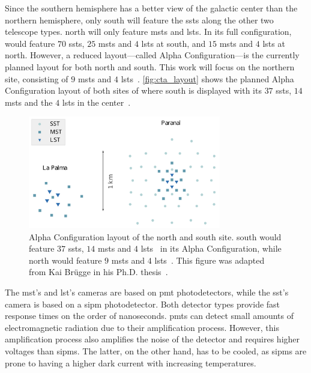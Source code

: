 Since the southern hemisphere has a better view of the galactic center than the northern hemisphere,
only \cta{} south will feature the \glspl{sst} along the other two telescope types. \cta{} north
will only feature \glspl{mst} and \glspl{lst}. In its full configuration, \cta{} would feature
\(\num{70}\) \glspl{sst}, \(\num{25}\) \glspl{mst} and \(\num{4}\) \glspl{lst} at \cta{} south,
and \(\num{15}\) \glspl{mst} and \(\num{4}\) \glspl{lst} at \cta{} north. However, a reduced
layout---called Alpha Configuration---is the currently planned layout for both \cta{}
north and south. This work will focus on the northern site, consisting of \(\num{9}\) \glspl{mst}
and \(\num{4}\) \glspl{lst}~\cite{cta_north_layout}. \autoref{fig:cta_layout} shows the planned
Alpha Configuration layout of both sites of \cta{} where \cta{} south is displayed with its
\(\num{37}\) \glspl{sst}, \(\num{14}\) \glspl{mst} and the \(\num{4}\) \glspl{lst} in the center~\cite{cta_south_layout}.
\begin{figure}
    \centering
    \includegraphics[width=0.75\textwidth]{graphics/cta_layout.pdf}
    \caption{Alpha Configuration layout of the \cta{} north and \cta{}
    south site. \cta{} south would feature \(\num{37}\) \glspl{sst}, \(\num{14}\) \glspl{mst} and
    \(\num{4}\) \glspl{lst}~\cite{cta_south_layout} in its Alpha Configuration, while \cta{} north would
    feature \(\num{9}\) \glspl{mst} and \(\num{4}\) \glspl{lst}~\cite{cta_north_layout}.
    This figure was adapted from Kai Br\"ugge in his Ph.D. thesis~\cite{bruegge_thesis}.}%
    \label{fig:cta_layout}
\end{figure}

The \gls{mst}'s and \gls{lst}'s cameras are based on \gls{pmt} photodetectors, while the \gls{sst}'s
camera is based on a \gls{sipm} photodetector. Both detector types provide fast response times on the
order of nanoseconds. \glspl{pmt} can detect small amounts of electromagnetic radiation due to their
amplification process. However, this amplification process also amplifies the noise of the detector
and requires higher voltages than \glspl{sipm}. The latter, on the other hand, has to be cooled,
as \glspl{sipm} are prone to having a higher dark current with increasing temperatures.

